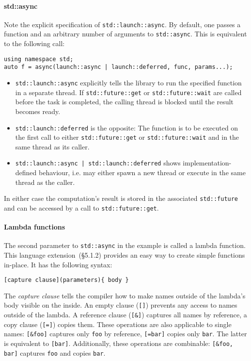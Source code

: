 \paragraph{std::async}

Note the explicit specification of \texttt{std::launch::async}. By default, one passes a function and an arbitrary number of arguments to \texttt{std::async}. This is equivalent to the following call:

\begin{verbatim}
using namespace std;
auto f = async(launch::async | launch::deferred, func, params...);
\end{verbatim}

\begin{itemize}
\item \texttt{std::launch::async} explicitly tells the library to run the specified function in a separate thread. If \texttt{std::future::get} or \texttt{std::future::wait} are called before the task is completed, the calling thread is blocked until the result becomes ready.
\item \texttt{std::launch::deferred} is the opposite: The function is to be executed on the first call to either \texttt{std::future::get} or \texttt{std::future::wait} and in the same thread as its caller.
\item \texttt{std::launch::async | std::launch::deferred} shows implementation-defined behaviour, i.e. may either spawn a new thread or execute in the same thread as the caller.
\end{itemize}

\noindent In either case the computation's result is stored in the associated \texttt{std::future} and can be accessed by a call to \texttt{std::future::get}.

\paragraph{Lambda functions}

The second parameter to \texttt{std::async} in the example is called a lambda function. This language extension~\cite{cpp11std}(§5.1.2) provides an easy way to create simple functions in-place. It has the following syntax:

\begin{verbatim}
[capture clause](parameters){ body }
\end{verbatim}

\noindent The \textit{capture clause} tells the compiler how to make names outside of the lambda's body visible on the inside. An empty clause (\texttt{[]}) prevents any access to names outside of the lambda. A reference clause (\texttt{[\&]}) captures all names by reference, a copy clause (\texttt{[=]}) copies them. These operations are also applicable to single names: \texttt{[\&foo]} captures only \texttt{foo} by reference, \texttt{[=bar]} copies only \texttt{bar}. The latter is equivalent to \texttt{[bar]}. Additionally, these operations are combinable: \texttt{[\&foo, bar]} captures \texttt{foo} and copies \texttt{bar}.

